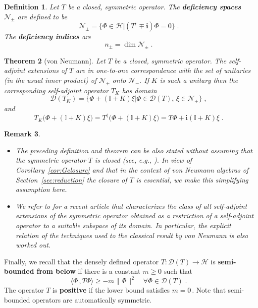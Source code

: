 \documentclass[a4paper,12pt]{amsart}
\newcommand{\scalar}[2]{\langle#1\,,#2\rangle}
\newcommand{\norm}[1]{\|#1\|}
\renewcommand{\H}{\mathcal{H}}
\newcommand{\D}{\mathcal{D}}
\newcommand{\1}{\mathbb{I}}
\newtheorem{theorem}{Theorem}
\newtheorem{definition}[theorem]{Definition}
\newtheorem{remark}[theorem]{Remark}
\numberwithin{equation}{section}
\numberwithin{theorem}{section}
\begin{document}
\begin{definition}\label{def:deficiencyspaces}
Let $T$ be a closed, symmetric operator. The \textbf{deficiency spaces} $\mathcal{N}_{\pm}$ are defined to be
$$\mathcal{N}_{\pm}=\{\Phi\in\H\bigr|(T^\dagger\mp\mathbf{i})\Phi=0\}\;.$$ The \textbf{deficiency indices} are
$$n_{\pm}=\operatorname{dim}\mathcal{N}_{\pm}\;.$$
\end{definition}


\begin{theorem}[von Neumann]\label{thmvonNeumann}
Let $T$ be a closed, symmetric operator. The self-adjoint extensions of $T$ are in one-to-one correspondence with the set of unitaries
(in the usual inner product) of $\mathcal{N}_+$ onto $\mathcal{N}_-$. If $K$ is such a unitary then the corresponding self-adjoint operator
$T_K$ has domain $$\D(T_K)=\{\Phi+(\mathbb{I}+K)\xi\bigr|\Phi\in\D(T),\,\xi\in\mathcal{N}_+\}\;,$$ and
$$T_K\bigl(\Phi+(\mathbb{I}+K)\xi\bigr)=T^\dagger\bigl(\Phi+(\mathbb{I}+K)\xi\bigr)= T\Phi+\mathbf{i}(\mathbb{I}+K)\xi\;.$$
\end{theorem}

\begin{remark}
\begin{itemize}
\item[(i)]
The preceding definition and theorem can be also stated without assuming that the symmetric operator $T$
is closed (see, e.g., \cite[Section~XII.4]{DunfordII}). In view of Corollary~\ref{cor:Gclosure} and that in the context of
von Neumann algebras of Section~\ref{sec:reduction} the closure of $T$ is essential, we make this simplifying assumption
here.

\item[(ii)]
We refer to \cite{Posilicano08} for a recent article that characterizes the class of all self-adjoint extensions
of the symmetric operator obtained as a restriction of a self-adjoint operator to a suitable subspace of its domain. In particular,
the explicit relation of the techniques used to the classical result by von Neumann is also worked out.

\end{itemize}
\end{remark}


Finally, we recall that the densely defined operator $T\colon\D(T)\to\H$ is
\textbf{semi-bounded from below} if there is a constant $m\geq0$ such that
$$\scalar{\Phi}{T\Phi}\geq -m\norm{\Phi}^2\quad\forall\Phi\in\D(T)\;.$$
The operator $T$ is \textbf{positive} if the lower bound satisfies $m=0$\,.
Note that semi-bounded operators are automatically symmetric.
\end{document}
